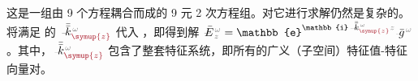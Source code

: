 这是一组由 9 个方程耦合而成的 9 元 2 次方程组。对它进行求解仍然是复杂的\cite{sturmElectromagneticWavesCrystals2024}。将满足  的 $\xint{\begin{smallmatrix} ~ \\ {}^{}_{\mathcolor{gray}{-}} \\ ~ \end{smallmatrix}}{15}{\bar{\bar{k}}}_{\textcolor{Maroon}{\symup{z}}}^{\;\! \mathcolor{gray}{\omega}}$ 代入 ，即得到解 $\xint{\mathcolor{gray}{-}}{25}{\bar{E}}^{\;\!\mathcolor{gray}{\omega}}_{\;\! \mathcolor{gray}{z}} = \mathbb{e}^{\mathbb{i} \xint{\begin{smallmatrix} ~ \\ {}^{}_{\mathcolor{gray}{-}} \\ ~ \end{smallmatrix}}{15}{\bar{\bar{k}}}_{\textcolor{Maroon}{\symup{z}}}^{\;\! \mathcolor{gray}{\omega}} \mathcolor{gray}{z}} \xint{{}^{}_{\mathcolor{gray}{-}}}{10}{\bar{g}}^{\;\!\mathcolor{gray}{\omega}}$。其中，$\xint{\begin{smallmatrix} ~ \\ {}^{}_{\mathcolor{gray}{-}} \\ ~ \end{smallmatrix}}{15}{\bar{\bar{k}}}_{\textcolor{Maroon}{\symup{z}}}^{\;\! \mathcolor{gray}{\omega}}$ 包含了整套\textcolor{PineGreen}{特征系统}，即所有的广义（子空间）\textcolor{PineGreen}{特征值}-\textcolor{PineGreen}{特征向量}对\cite{xieAnalytic3DVector}。

